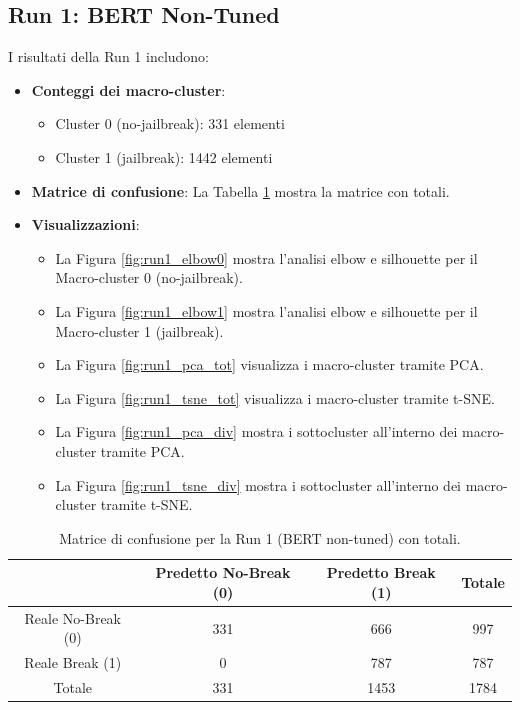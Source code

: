 \documentclass[a4paper,12pt]{article}
\begin{document}
\subsection{Run 1: BERT Non-Tuned}
I risultati della Run 1 includono:
\begin{itemize}
\item \textbf{Conteggi dei macro-cluster}:
  \begin{itemize}
  \item Cluster 0 (no-jailbreak): 331 elementi
  \item Cluster 1 (jailbreak): 1442 elementi
  \end{itemize}
\item \textbf{Matrice di confusione}: La Tabella \ref{tab:conf_run1_tot} mostra la matrice con totali.
\item \textbf{Visualizzazioni}:
  \begin{itemize}
  \item La Figura \ref{fig:run1_elbow0} mostra l'analisi elbow e silhouette per il Macro-cluster 0 (no-jailbreak).
  \item La Figura \ref{fig:run1_elbow1} mostra l'analisi elbow e silhouette per il Macro-cluster 1 (jailbreak).
  \item La Figura \ref{fig:run1_pca_tot} visualizza i macro-cluster tramite PCA.
  \item La Figura \ref{fig:run1_tsne_tot} visualizza i macro-cluster tramite t-SNE.
  \item La Figura \ref{fig:run1_pca_div} mostra i sottocluster all'interno dei macro-cluster tramite PCA.
  \item La Figura \ref{fig:run1_tsne_div} mostra i sottocluster all'interno dei macro-cluster tramite t-SNE.
  \end{itemize}
\end{itemize}

\begin{table}[h]
    \centering
    \begin{tabular}{c|cc|c}
        \toprule
        & Predetto No-Break (0) & Predetto Break (1) & Totale \\
        \midrule
        Reale No-Break (0) & 331 & 666 & 997 \\
        Reale Break (1) & 0 & 787 & 787 \\
        \midrule
        Totale & 331 & 1453 & 1784 \\
        \bottomrule
    \end{tabular}
    \caption{Matrice di confusione per la Run 1 (BERT non-tuned) con totali.}
    \label{tab:conf_run1_tot}
\end{table}
\end{document}
